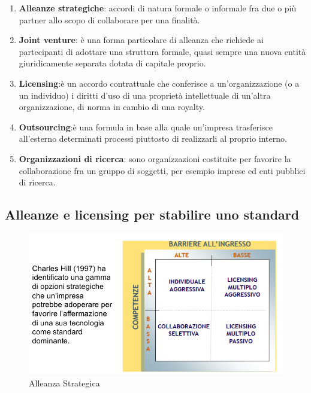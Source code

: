 \documentclass{article}
\begin{document}
\begin{enumerate}
\item  \textbf{Alleanze strategiche}: accordi di natura formale o informale fra
due o più partner allo scopo di collaborare per una finalità.
\item \textbf{Joint venture}: è una forma particolare di alleanza che richiede ai
partecipanti di adottare una struttura formale, quasi sempre una
nuova entità giuridicamente separata dotata di capitale proprio.
\item \textbf{Licensing}:è un accordo contrattuale che conferisce a
un’organizzazione (o a un individuo) i diritti d’uso di una proprietà
intellettuale di un’altra organizzazione, di norma in cambio di una
royalty.
\item \textbf{Outsourcing}:è una formula in base alla quale un’impresa
trasferisce all’esterno determinati processi piuttosto di realizzarli
al proprio interno.
\item \textbf{Organizzazioni di ricerca}: sono organizzazioni costituite per
favorire la collaborazione fra un gruppo di soggetti, per esempio
imprese ed enti pubblici di ricerca.
\end{enumerate}

\subsection{Alleanze e licensing per stabilire uno standard}
\begin{figure}[h!]
	\centering
	\includegraphics[scale=0.4]{images/licensing.png}
	\caption{Alleanza Strategica}
	\label{fig:Porter2}
\end{figure}
\end{document}
